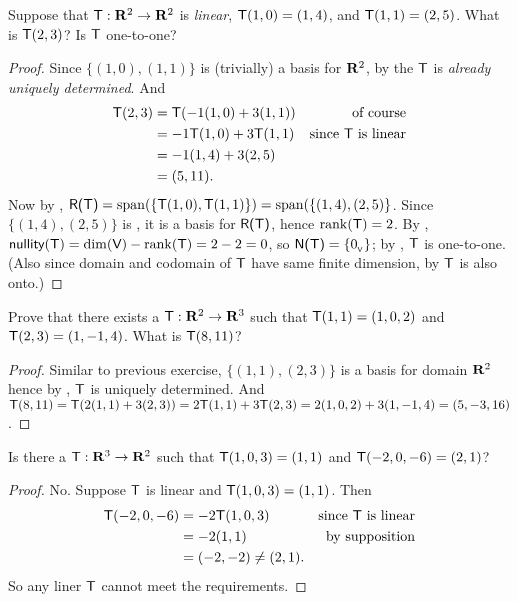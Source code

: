 \begin{exercise} \label{exercise 2.1.10}
Suppose that \(\textsf{T} : \mathbf{R}^2 \to \mathbf{R}^2\) is \emph{linear}, \(\textsf{T}(1, 0) = (1, 4)\), and \(\textsf{T}(1, 1) = (2, 5)\).
What is \(\textsf{T}(2, 3)\)?
Is \(\textsf{T}\) one-to-one?
\end{exercise}

\begin{proof}
Since \(\{ (1, 0), (1, 1) \}\) is (trivially) a basis for \(\mathbf{R}^2\), by  the \(\textsf{T}\) is \emph{already uniquely determined}.
And
\begin{align*}
    \textsf{T}(2, 3) & = \textsf{T}(-1(1, 0) + 3(1, 1)) & \text{of course} \\
             & = -1\textsf{T}(1, 0) + 3\textsf{T}(1, 1) & \text{since \(\textsf{T}\) is linear} \\
             & = -1(1, 4) + 3(2, 5) \\
             & = (5, 11).
\end{align*}
Now by , \(\textsf{R(T)} = \operatorname{span}(\{ \textsf{T}(1, 0), \textsf{T}(1, 1) \}) = \operatorname{span}(\{ (1, 4), (2, 5) \}\).
Since \(\{ (1, 4), (2, 5) \}\) is \LID{}, it is a basis for \(\textsf{R(T)}\), hence \(\mathrm{rank}(\textsf{T}) = 2\).
By , \(\textsf{nullity}(\textsf{T}) = \dim(\textsf{V}) - \mathrm{rank}(\textsf{T}) = 2 - 2 = 0\), so \(\textsf{N(T)} = \{ 0_{_{\textsf{V}}} \}\);
by , \(\textsf{T}\) is one-to-one.
(Also since domain and codomain of \(\textsf{T}\) have same finite dimension, by  \(\textsf{T}\) is also onto.)
\end{proof}

\begin{exercise} \label{exercise 2.1.11}
Prove that there exists a \LTRAN{} \(\textsf{T} : \mathbf{R}^2 \to \mathbf{R}^3\) such that \(\textsf{T}(1, 1) = (1, 0, 2)\) and \(\textsf{T}(2, 3) = (1, -1, 4)\).
What is \(\textsf{T}(8, 11)\)?
\end{exercise}

\begin{proof}
Similar to previous exercise, \(\{ (1, 1), (2, 3) \}\) is a basis for domain \(\mathbf{R}^2\) hence by , \(\textsf{T}\) is uniquely determined.
And \(\textsf{T}(8, 11) = \textsf{T}(2(1, 1) + 3(2, 3)) = 2\textsf{T}(1, 1) + 3\textsf{T}(2, 3) = 2(1, 0, 2) + 3(1, -1, 4) = (5, -3, 16)\).
\end{proof}

\begin{exercise} \label{exercise 2.1.12}
Is there a \LTRAN{} \(\textsf{T} : \mathbf{R}^3 \to \mathbf{R}^2\) such that \(\textsf{T}(1, 0, 3) = (1, 1)\) and \(\textsf{T}(-2, 0, -6) = (2, 1)\)?
\end{exercise}

\begin{proof}
No.
Suppose \(\textsf{T}\) is linear and \(\textsf{T}(1, 0, 3) = (1, 1)\).
Then
\begin{align*}
    \textsf{T}(-2, 0, -6) & = -2\textsf{T}(1, 0, 3) & \text{since \(\textsf{T}\) is linear} \\
                  & = -2(1, 1) & \text{by supposition} \\
                  & = (-2, -2) \ne (2, 1).
\end{align*}
So any liner \(\textsf{T}\) cannot meet the requirements.
\end{proof}

